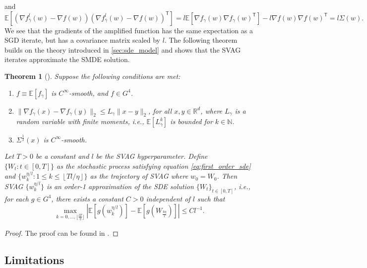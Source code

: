 \documentclass[12pt]{article}
\newtheorem{theorem}{Theorem}[section]
\theoremstyle{definition}
\numberwithin{equation}{section}
\newcommand{\N}{\mathbb{N}}
\newcommand{\R}{\mathbb{R}}
\newcommand{\T}{\mathsf{T}}
\newcommand{\ev}[1]{\mathbb{E}\left[{#1}\right]}
\newcommand{\norm}[1]{\lVert{#1}\rVert_2}
\begin{document}
and
\begin{equation*}
  \ev{\left(\nabla f^l_{\bar{\gamma}}(w) - \nabla f(w)\right)\left(\nabla f^l_{\bar{\gamma}}(w) - \nabla f(w)\right)^\T} = l\ev{\nabla f_{\gamma}(w)\nabla f_{\gamma}(w)^\T} - l \nabla f(w) \nabla f(w)^\T = l \Sigma(w).
\end{equation*}
We see that the gradients of the amplified function has the same expectation as a SGD iterate, but has a covariance matrix scaled by $l$.
The following theorem builds on the theory introduced in \autoref{sec:sde_model} and shows that the SVAG iterates approximate the SMDE solution.
\begin{theorem}[\cite{liValidityModelingSGD2021}]
  \label{thm:svag}
  Suppose the following conditions are met:
  \begin{enumerate}[label=(\roman*)]
    \item $f \equiv \ev{f_{\gamma}}$ is $C^{\infty}$-smooth, and $f \in G^4$.
    \item $\norm{\nabla f_{\gamma}(x) - \nabla f_{\gamma}(y)} \leq L_{\gamma} \norm{x - y}$, for all $x, y \in \R^d$, where $L_{\gamma}$ is a random variable with finite moments, i.e., $\ev{L_{\gamma}^k}$ is bounded for $k \in \N$.
    \item $\Sigma^{\frac{1}{2}}(x)$ is $C^{\infty}$-smooth.
  \end{enumerate}
  Let $T > 0$ be a constant and $l$ be the SVAG hyperparameter. Define $\{W_t : t \in [0,T] \}$ as the stochastic process satisfying equation \eqref{eq:first_order_sde} and $\{w_k^{\eta/l}: 1 \leq k \leq \left\lfloor Tl/\eta \right\rfloor \}$ as the trajectory of SVAG where $w_0 = W_0$. Then SVAG $\{w_k^{\eta/l}\}$ is an order-1 approximation of the SDE solution $\{W_t\}_{t \in [0,T]}$, i.e., for each $g \in G^4$, there exists a constant $C > 0$ independent of $l$ such that
  \begin{equation*}
    \max_{k=0,\dots, \lfloor \frac{lT}{\eta} \rfloor} \left\lvert \ev{g(w^{\eta/l}_k)} - \ev{g(W_{\frac{k\eta}{l}})} \right\rvert \leq C l^{-1}.
  \end{equation*}
\end{theorem}
\begin{proof}
  The proof can be found in \cite{liValidityModelingSGD2021}.
\end{proof}
\subsection{Limitations}
\end{document}
